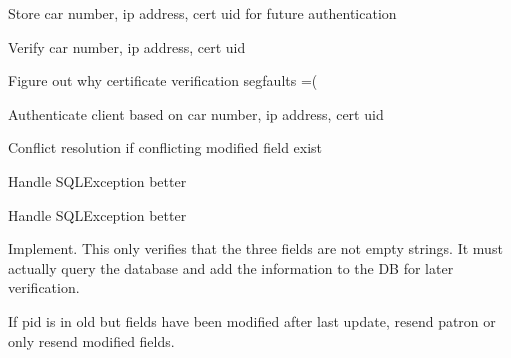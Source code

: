 
\begin{DoxyRefList}
\item[\label{todo__todo000001}%
\hypertarget{todo__todo000001}{}%
Member \hyperlink{classGTBCommunication_aed33aec9911e0d570d4653cabd776d6b}{G\-T\-B\-Communication\-:\-:auth\-Request} (\hyperlink{classRequest}{Request} $\ast$i\-\_\-a\-P\-B\-Req)]Store car number, ip address, cert uid for future authentication  
\item[\label{todo__todo000002}%
\hypertarget{todo__todo000002}{}%
Member \hyperlink{classGTBCommunication_ae20ca3b3751720d3ef10bbdfbd4cd25a}{G\-T\-B\-Communication\-:\-:curr\-Request} (\hyperlink{classRequest}{Request} $\ast$i\-\_\-a\-P\-B\-Req, \hyperlink{classResponse}{Response} $\ast$i\-\_\-apb\-Res)]Verify car number, ip address, cert uid  
\item[\label{todo__todo000004}%
\hypertarget{todo__todo000004}{}%
Member \hyperlink{classGTBCommunication_a6353b9cc417d4f7a3fd309fc911cf8f1}{G\-T\-B\-Communication\-:\-:handle\-Connection} (int fd\-Accepted, int sockfd)]Figure out why certificate verification segfaults =( 
\item[\label{todo__todo000003}%
\hypertarget{todo__todo000003}{}%
Member \hyperlink{classGTBCommunication_afd6c49f0bd73a7c2014673b58c87c68b}{G\-T\-B\-Communication\-:\-:updt\-Request} (\hyperlink{classRequest}{Request} $\ast$i\-\_\-a\-P\-B\-Req, \hyperlink{classResponse}{Response} $\ast$i\-\_\-apb\-Res)]Authenticate client based on car number, ip address, cert uid 

Conflict resolution if conflicting modified field exist  
\item[\label{todo__todo000010}%
\hypertarget{todo__todo000010}{}%
Member \hyperlink{classMySQLConn_a045c9cb16434df8c1e50dd7ef6766c5f}{My\-S\-Q\-L\-Conn\-:\-:add\-Location} (std\-::string loc)]Handle S\-Q\-L\-Exception better  
\item[\label{todo__todo000009}%
\hypertarget{todo__todo000009}{}%
Member \hyperlink{classMySQLConn_a017c08a9bfdf5c20509f754af7c8c7f7}{My\-S\-Q\-L\-Conn\-:\-:add\-Patron} (int carnum, \hyperlink{classRequest}{Request} $\ast$i\-\_\-a\-P\-B\-Req)]Handle S\-Q\-L\-Exception better  
\item[\label{todo__todo000006}%
\hypertarget{todo__todo000006}{}%
Member \hyperlink{classMySQLConn_ae96f09e4aa859a5294c90ec498c38928}{My\-S\-Q\-L\-Conn\-:\-:check\-Auth} (std\-::string i\-\_\-snetid, std\-::string i\-\_\-sauth, std\-::string i\-\_\-scarnum)]Implement. This only verifies that the three fields are not empty strings. It must actually query the database and add the information to the D\-B for later verification.  
\item[\label{todo__todo000007}%
\hypertarget{todo__todo000007}{}%
Member \hyperlink{classMySQLConn_a259785bc51cae6d0c6c950f6bdf6f475}{My\-S\-Q\-L\-Conn\-:\-:get\-Curr} (int carnum, \hyperlink{classPatronList}{Patron\-List} $\ast$i\-\_\-apb\-Patl, std\-::vector$<$ int $>$)]If pid is in old but fields have been modified after last update, resend patron or only resend modified fields. 


\end{DoxyRefList}
